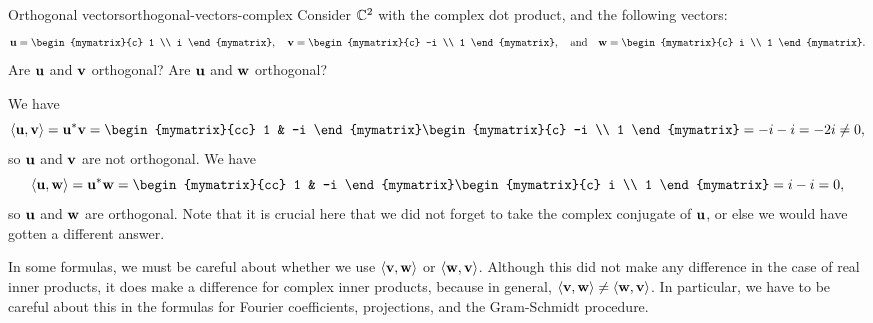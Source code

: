 \begin{example}{Orthogonal vectors}{orthogonal-vectors-complex}
  Consider $\mathbb{C}^2$ with the complex dot product, and the following
  vectors:
  \begin{equation*}
    \vect{u}=\begin{mymatrix}{c} 1 \\ i \end{mymatrix},
    \quad
    \vect{v}=\begin{mymatrix}{c} -i \\ 1 \end{mymatrix},
    \quad\mbox{and}\quad
    \vect{w}=\begin{mymatrix}{c} i \\ 1 \end{mymatrix}.
  \end{equation*}
  Are $\vect{u}$ and $\vect{v}$ orthogonal? Are $\vect{u}$ and
  $\vect{w}$ orthogonal?
\end{example}

\begin{solution}
  We have
  \begin{equation*}
    \iprod{\vect{u},\vect{v}}
    = \vect{u}^{\adjoint}\vect{v}
    = \begin{mymatrix}{cc} 1 & -i \end{mymatrix}
    \begin{mymatrix}{c} -i \\ 1 \end{mymatrix}
    = -i-i
    = -2i
    \neq 0,
  \end{equation*}
  so $\vect{u}$ and $\vect{v}$ are not orthogonal. We have
  \begin{equation*}
    \iprod{\vect{u},\vect{w}}
    = \vect{u}^{\adjoint}\vect{w}
    = \begin{mymatrix}{cc} 1 & -i \end{mymatrix}
    \begin{mymatrix}{c} i \\ 1 \end{mymatrix}
    = i-i
    = 0,
  \end{equation*}
  so $\vect{u}$ and $\vect{w}$ are orthogonal. Note that it is crucial
  here that we did not forget to take the complex conjugate of
  $\vect{u}$, or else we would have gotten a different answer.
\end{solution}

In some formulas, we must be careful about whether we use
$\iprod{\vect{v},\vect{w}}$ or $\iprod{\vect{w},\vect{v}}$. Although
this did not make any difference in the case of real inner products,
it does make a difference for complex inner products, because in
general, $\iprod{\vect{v},\vect{w}}\neq \iprod{\vect{w},\vect{v}}$. In
particular, we have to be careful about this in the formulas for
Fourier coefficients, projections, and the Gram-Schmidt procedure.

